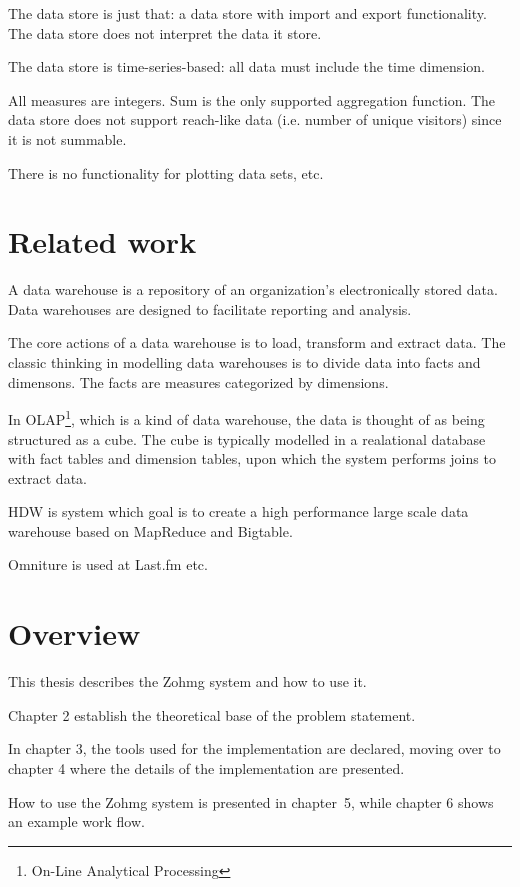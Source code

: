\documentclass[a4paper,10pt]{book}
\begin{document}
The data store is just that: a data store with import and export
functionality. The data store does not interpret the data it store.

The data store is time-series-based: all data must include the time dimension.

All measures are integers. Sum is the only supported aggregation function. The
data store does not support reach-like data (i.e. number of unique visitors)
since it is not summable.

There is no functionality for plotting data sets, etc.



\section{Related work}

A data warehouse is a repository of an organization's
electronically stored data. Data warehouses are designed to facilitate
reporting and analysis. \cite{wikipedia}

The core actions of a data warehouse is to load, transform and extract data.
The classic thinking in modelling data warehouses is to divide data into facts
and dimensons. The facts are measures categorized by dimensions.

In OLAP\footnote{On-Line Analytical Processing}, which is a kind of data
warehouse, the data is thought of as being structured as a cube. The cube is
typically modelled in a realational database with fact tables and dimension
tables, upon which the system performs joins to extract data.
\cite{olap_solutions}

HDW is system which goal is to create a high performance large scale data
warehouse based on MapReduce and Bigtable. \cite{hdw}

Omniture is used at Last.fm etc.



\section{Overview}

This thesis describes the Zohmg system and how to use it.

Chapter 2 establish the theoretical base of the problem statement.

In chapter 3, the tools used for the implementation are declared, moving
over to chapter 4 where the details of the implementation are presented.

How to use the Zohmg system is presented in chapter~5, while chapter 6
shows an example work flow.
\end{document}
